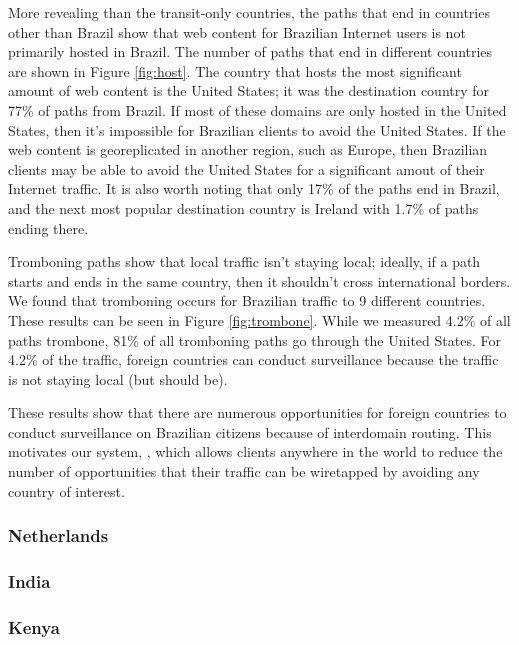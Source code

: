 More revealing than the transit-only countries, the paths that end in countries other than Brazil show that web content for Brazilian Internet users is not primarily hosted in Brazil.  The number of paths that end in different countries are shown in Figure \ref{fig:host}.  The country that hosts the most significant amount of web content is the United States; it was the destination country for 77\% of paths from Brazil.  If most of these domains are only hosted in the United States, then it's impossible for Brazilian clients to avoid the United States.  If the web content is georeplicated in another region, such as Europe, then Brazilian clients may be able to avoid the United States for a significant amout of their Internet traffic.  It is also worth noting that only 17\% of the paths end in Brazil, and the next most popular destination country is Ireland with 1.7\% of paths ending there.  

Tromboning paths show that local traffic isn't staying local; ideally, if a path starts and ends in the same country, then it shouldn't cross international borders.  We found that tromboning occurs for Brazilian traffic to 9 different countries.  These results can be seen in Figure \ref{fig:trombone}.  While we measured 4.2\% of all paths trombone, 81\% of all tromboning paths go through the United States.  For 4.2\% of the traffic, foreign countries can conduct surveillance because the traffic is not staying local (but should be). 



These results show that there are numerous opportunities for foreign countries to conduct surveillance on Brazilian citizens because of interdomain routing.  This motivates our system, \system{}, which allows clients anywhere in the world to reduce the number of opportunities that their traffic can be wiretapped by avoiding any country of interest.  

\subsubsection{Netherlands}

\subsubsection{India}

\subsubsection{Kenya}

